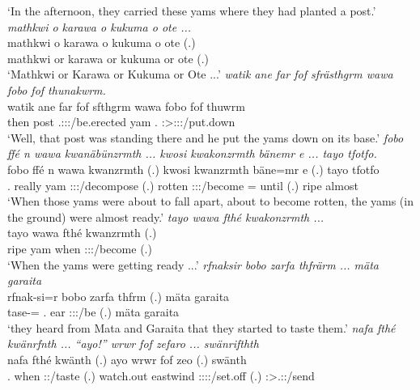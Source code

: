 \begin{exe}
	\trans `In the afternoon, they carried these yams where they had planted a post.'
	\emph{mathkwi o karawa o kukuma o ote ...}\\
	\gll mathkwi o karawa o kukuma o ote (.)\\ 
	mathkwi or karawa or kukuma or ote (.)\\
	\trans `Mathkwi or Karawa or Kukuma or Ote ...'
	\emph{watik ane far fof sfrästhgrm wawa fobo fof thunakwrm.}\\
	\gll watik ane far fof sfthgrm wawa fobo fof thuwrm\\ 
	then \Dem{} post \Emph{} \Tsg.\Masc:\Sbj:\Pst:\Dur/be.erected yam \Dist.\All{} \Emph{} \Sg:\Sbj>\Stpl:\Obj:\Pst:\Dur/put.down\\
	\trans `Well, that post was standing there and he put the yams down on its base.'
	\emph{fobo ffé n wawa kwanäbünzrmth ... kwosi kwakonzrmth bänemr e ... tayo tfotfo.}\\
	\gll fobo ffé n wawa kwanzrmth (.) kwosi kwanzrmth bäne=mr e (.) tayo tfotfo\\ 
	\Dist.\All{} really \Imn{} yam \Stpl:\Sbj:\Pst:\Dur/decompose (.) rotten \Stpl:\Sbj:\Pst:\Dur/become \Med=\Purp{} until (.) ripe almost\\
	\trans `When those yams were about to fall apart, about to become rotten, the yams (in the ground) were almost ready.'
	\emph{tayo wawa fthé kwakonzrmth ...}\\
	\gll tayo wawa fthé kwanzrmth (.)\\ 
	ripe yam when \Stpl:\Sbj:\Pst:\Dur/become (.)\\
	\trans `When the yams were getting ready ...'
	\emph{rfnaksir bobo zarfa thfrärm ... mäta garaita}\\
	\gll rfnak-si=r bobo zarfa thfrm (.) mäta garaita\\ 
	tase-\Nmlz=\Purp{} \Med.\All{} ear \Stpl:\Sbj:\Pst:\Dur/be (.) mäta garaita\\
	\trans `they heard from Mata and Garaita that they started to taste them.'
	\emph{nafa fthé kwänrfnth ... ``ayo!'' wrwr fof zefaro ... swänrifthth}\\
	\gll nafa fthé kwänth (.) ayo wrwr fof zeo (.) swänth\\ 
	\Tnsg.\Erg{} when \Stpl:\Sbj:\Iter/taste (.) watch.out eastwind \Emph{} \Sg:\Sbj:\Pst:\Pfv:\Andat/set.off (.) \Stpl:\Sbj>\Tsg.\Masc:\Obj:\Iter/send\\

\end{exe}
